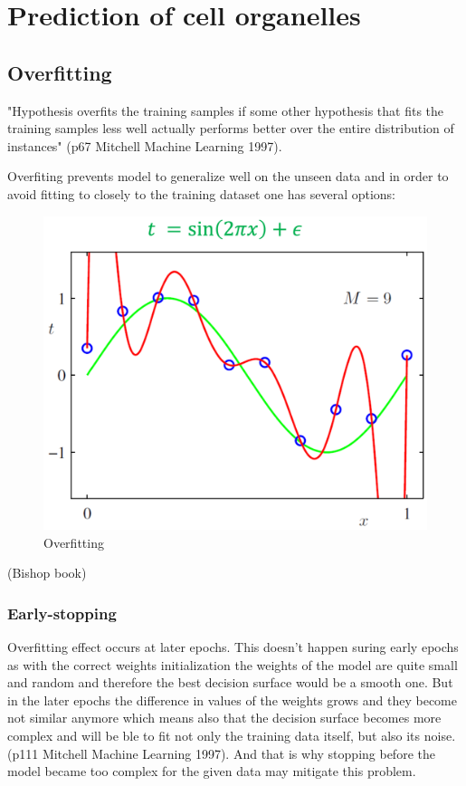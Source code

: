 \section{Prediction of cell organelles}
\subsection{Overfitting}

\begin{definition}[Overfitting]
    "Hypothesis overfits the training samples if some other hypothesis that fits the training samples less well actually performs better over the entire distribution of instances" (p67 Mitchell Machine Learning 1997).
\end{definition}

Overfiting prevents model to generalize well on the unseen data and in order to avoid fitting to closely to the training dataset one has several options:

\begin{figure}[htb]
	\begin{center}
		\includegraphics[width=0.6\linewidth]{bilder/overfit.png}
		\caption{Overfitting}\label{fig:overfit}
	\end{center}
\end{figure}

(Bishop book)

\subsubsection{Early-stopping}
Overfitting effect occurs at later epochs. This doesn't happen suring early epochs as with the correct weights initialization the weights of the model are quite small and random and therefore the best decision surface would be a smooth one. But in the later epochs the difference in values of the weights grows and they become not similar anymore which means also that the decision surface becomes more complex and will be ble to fit not only the training data itself, but also its noise. (p111 Mitchell Machine Learning 1997). And that is why stopping before the model became too complex for the given data may mitigate this problem.

